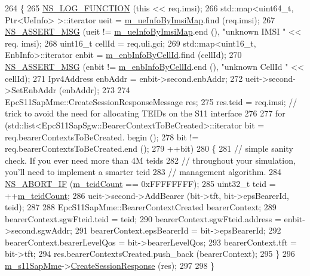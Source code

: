 \begin{DoxyCode}
264 \{
265   \hyperlink{log-macros-disabled_8h_a90b90d5bad1f39cb1b64923ea94c0761}{NS\_LOG\_FUNCTION} (\textcolor{keyword}{this} << req.imsi);
266   std::map<uint64\_t, Ptr<UeInfo> >::iterator ueit = \hyperlink{classns3_1_1EpcSgwPgwApplication_ac026923e4b06703faf659f0584573531}{m\_ueInfoByImsiMap}.find (req.imsi);
267   \hyperlink{assert_8h_aff5ece9066c74e681e74999856f08539}{NS\_ASSERT\_MSG} (ueit != \hyperlink{classns3_1_1EpcSgwPgwApplication_ac026923e4b06703faf659f0584573531}{m\_ueInfoByImsiMap}.end (), \textcolor{stringliteral}{"unknown IMSI "} << req.
      imsi); 
268   uint16\_t cellId = req.uli.gci;
269   std::map<uint16\_t, EnbInfo>::iterator enbit = \hyperlink{classns3_1_1EpcSgwPgwApplication_afa8f803a667fc1c54fc855a8a3d8e550}{m\_enbInfoByCellId}.find (cellId);
270   \hyperlink{assert_8h_aff5ece9066c74e681e74999856f08539}{NS\_ASSERT\_MSG} (enbit != \hyperlink{classns3_1_1EpcSgwPgwApplication_afa8f803a667fc1c54fc855a8a3d8e550}{m\_enbInfoByCellId}.end (), \textcolor{stringliteral}{"unknown CellId "} << 
      cellId); 
271   Ipv4Address enbAddr = enbit->second.enbAddr;
272   ueit->second->SetEnbAddr (enbAddr);
273 
274   EpcS11SapMme::CreateSessionResponseMessage res;
275   res.teid = req.imsi; \textcolor{comment}{// trick to avoid the need for allocating TEIDs on the S11 interface}
276 
277   \textcolor{keywordflow}{for} (std::list<EpcS11SapSgw::BearerContextToBeCreated>::iterator bit = req.bearerContextsToBeCreated.
      begin ();
278        bit != req.bearerContextsToBeCreated.end ();
279        ++bit)
280     \{
281       \textcolor{comment}{// simple sanity check. If you ever need more than 4M teids}
282       \textcolor{comment}{// throughout your simulation, you'll need to implement a smarter teid}
283       \textcolor{comment}{// management algorithm. }
284       \hyperlink{group__fatal_ga979468222aa80366c2c98aa1554f3eec}{NS\_ABORT\_IF} (\hyperlink{classns3_1_1EpcSgwPgwApplication_a160d5f7d28ef531f5fc9bd9bdd5ac9ff}{m\_teidCount} == 0xFFFFFFFF);
285       uint32\_t teid = ++\hyperlink{classns3_1_1EpcSgwPgwApplication_a160d5f7d28ef531f5fc9bd9bdd5ac9ff}{m\_teidCount};  
286       ueit->second->AddBearer (bit->tft, bit->epsBearerId, teid);
287 
288       EpcS11SapMme::BearerContextCreated bearerContext;
289       bearerContext.sgwFteid.teid = teid;
290       bearerContext.sgwFteid.address = enbit->second.sgwAddr;
291       bearerContext.epsBearerId =  bit->epsBearerId; 
292       bearerContext.bearerLevelQos = bit->bearerLevelQos; 
293       bearerContext.tft = bit->tft;
294       res.bearerContextsCreated.push\_back (bearerContext);
295     \}
296   \hyperlink{classns3_1_1EpcSgwPgwApplication_a37809771f2d925005b7deab8c5a2de3c}{m\_s11SapMme}->\hyperlink{classns3_1_1EpcS11SapMme_a844a9c2d1b8a5e3c5d61cb6b44d50c75}{CreateSessionResponse} (res);
297   
298 \}
\end{DoxyCode}


